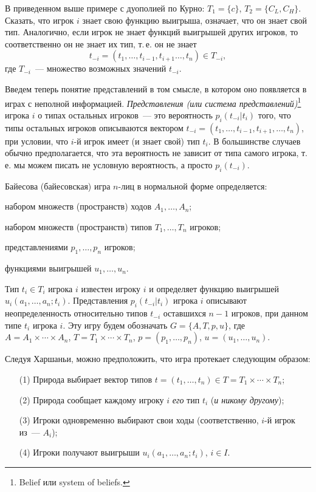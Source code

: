 В приведенном выше примере с дуополией по Курно: $T_1=\{c\}$,
$T_2=\{C_L,C_H\}$.  Сказать, что игрок $i$ знает свою функцию
выигрыша, означает, что он знает свой тип.  Аналогично, если игрок не
знает функций выигрышей других игроков, то соответственно он не
знает их тип, т.\,е. он не знает
$$
t_{-i}=(t_1,\ldots,t_{i-1},t_{i+1}\ldots,t_n)\in T_{-i},
$$
где $T_{-i}$~--- множество возможных значений $t_{-i}$.

Введем теперь понятие представлений в том смысле, в котором оно появляется
в играх с неполной информацией. {\it Представления (или система
представлений)}\footnote{ Belief  или system of beliefs.} игрока
$i$ о типах остальных игроков~--- это вероятность $p_i(t_{-i}|t_i)$
того, что типы остальных игроков описываются вектором $t_{-i}=(t_1,
\ldots,t_{i-1},t_{i+1},\ldots,t_n)$, при условии, что $i$-й игрок имеет (и
знает свой) тип $t_i$.  В большинстве случаев обычно предполагается, что
эта вероятность не зависит от типа самого игрока, т.\,е. мы можем писать не
условную вероятность, а просто $p_i(t_{-i})$.

\begin{definition}
Байесова (байесовская) игра $n$-лиц в нормальной форме определяется:

набором множеств (пространств) ходов $A_1,\ldots,A_n$;

набором множеств (пространств) типов $T_1,\ldots,T_n$ игроков;

представлениями $p_1,\ldots,p_n$ игроков;

функциями выигрышей $u_1,\ldots,u_n$.

Тип $t_i\in T_i$ игрока $i$ известен игроку $i$ и определяет функцию
выигрышей $u_i(a_1,\ldots,a_n;t_i)$. Представления $p_i(t_{-i}|t_i)$
игрока $i$ описывают неопределенность относительно типов $t_{-i}$
оставшихся $n-1$ игроков, при данном типе $t_i$ игрока $i$. Эту игру
будем обозначать $G=\{A,T,p,u\}$, где $A=A_1\times\cdots\times A_n$,
$T=T_1\times\cdots\times T_n$, $p=(p_1,\ldots,p_n)$,
$u=(u_1,\ldots,u_n)$.
\end{definition}

Следуя Харшаньи, можно предположить, что игра протекает следующим образом:
\begin{itemize}
\item[(1)] Природа выбирает вектор типов $t=(t_1,\ldots,t_n)\in
T=T_1\times\cdots\times T_n$;
\item[(2)] Природа сообщает каждому игроку $i$ {\it его} тип
$t_i$ ({\it и никому другому});
\item[(3)] Игроки одновременно выбирают свои ходы (соответственно, $i$-й
игрок из~--- $A_i$);
\item[(4)] Игроки получают выигрыши $u_i(a_1,\ldots,a_n;t_i)$, $i\in I$.
\end{itemize}

